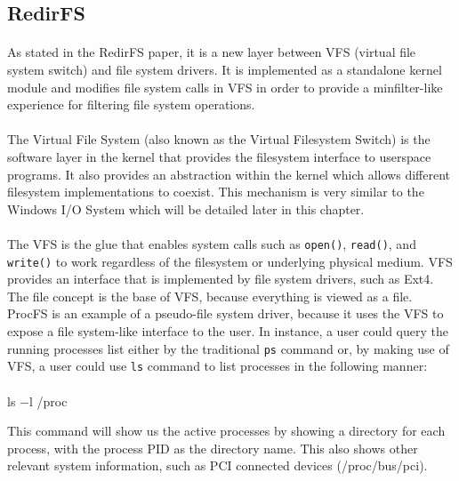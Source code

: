 	\subsection{RedirFS}
	\paragraph{}
	As stated in the RedirFS paper, it is a new layer between VFS (virtual file system switch) and file system drivers\cite{RedirFS}. It is implemented as a standalone kernel module and modifies file system calls in VFS in order to provide a minfilter-like experience for filtering file system operations.
	
	\paragraph{}
	The Virtual File System (also known as the Virtual Filesystem Switch) is the software layer in the kernel that provides the filesystem interface to userspace programs. It also provides an abstraction
	within the kernel which allows different filesystem implementations to coexist\cite{KernelArchivesVFS}. This mechanism is very similar to the Windows I/O System which will be detailed later in this chapter.
	
	\paragraph{}
	The VFS is the glue that enables system calls such as \texttt{open()}, \texttt{read()}, and \texttt{write()} to work regardless of the filesystem or underlying physical medium\cite{LinuxKernelDevelopment}. VFS provides an interface that is implemented by file system drivers, such as Ext4. The file concept is the base of VFS, because everything is viewed as a file. ProcFS is an example of a pseudo-file system driver, because it uses the VFS to expose a file system-like interface to the user. In instance, a user could query the running processes list either by the traditional \texttt{ps} command or, by making use of VFS, a user could use \texttt{ls} command to list processes in the following manner:
	
	\paragraph{}
	\bigskip
	\centerline{ls $-$l /proc}
	\bigskip
	
	This command will show us the active processes by showing a directory for each process, with the process PID as the directory name. This also shows other relevant system information, such as PCI connected devices (/proc/bus/pci).
	
